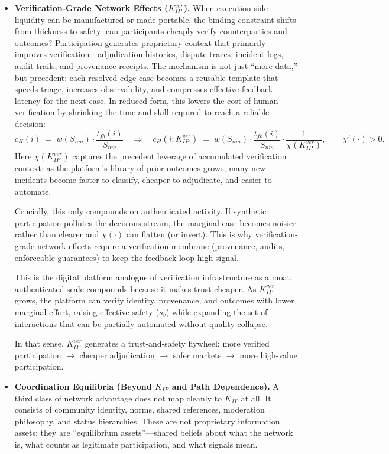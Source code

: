 \documentclass[12pt, letter]{article}
\begin{document}
\begin{itemize}
    \item \textbf{Verification-Grade Network Effects ($K_{IP}^{ver}$).} When execution-side liquidity can be manufactured or made portable, the binding constraint shifts from thickness to safety: can participants cheaply verify counterparties and outcomes? Participation generates proprietary context that primarily improves verification---adjudication histories, dispute traces, incident logs, audit trails, and provenance receipts. The mechanism is not just ``more data,'' but precedent: each resolved edge case becomes a reusable template that speeds triage, increases observability, and compresses effective feedback latency for the next case. In reduced form, this lowers the cost of human verification by shrinking the time and skill required to reach a reliable decision:
    \[
    c_H(i) \;=\; w(S_{nm})\cdot \frac{t_{fb}(i)}{S_{nm}}
    \quad\Rightarrow\quad
    c_H(i;K_{IP}^{ver}) \;=\; w(S_{nm})\cdot \frac{t_{fb}(i)}{S_{nm}}\cdot \frac{1}{\chi(K_{IP}^{ver})},
    \qquad \chi'(\cdot)>0.
    \]
    Here $\chi(K_{IP}^{ver})$ captures the precedent leverage of accumulated verification context: as the platform’s library of prior outcomes grows, many new incidents become faster to classify, cheaper to adjudicate, and easier to automate.

    Crucially, this only compounds on authenticated activity. If synthetic participation pollutes the decisions stream, the marginal case becomes noisier rather than clearer and $\chi(\cdot)$ can flatten (or invert). This is why verification-grade network effects require a verification membrane (provenance, audits, enforceable guarantees) to keep the feedback loop high-signal.

    This is the digital platform analogue of verification infrastructure as a moat: authenticated scale compounds because it makes trust cheaper. As $K_{IP}^{ver}$ grows, the platform can verify identity, provenance, and outcomes with lower marginal effort, raising effective safety ($s_v$) while expanding the set of interactions that can be partially automated without quality collapse. 
    
    In that sense, $K_{IP}^{ver}$ generates a trust-and-safety flywheel: more verified participation $\rightarrow$ cheaper adjudication $\rightarrow$ safer markets $\rightarrow$ more high-value participation.


    \item \textbf{Coordination Equilibria (Beyond $K_{IP}$ and Path Dependence).} A third class of network advantage does not map cleanly to $K_{IP}$ at all. It consists of community identity, norms, shared references, moderation philosophy, and status hierarchies. These are not proprietary information assets; they are ``equilibrium assets''---shared beliefs about what the network is, what counts as legitimate participation, and what signals mean.  
    

\end{itemize}
\end{document}
